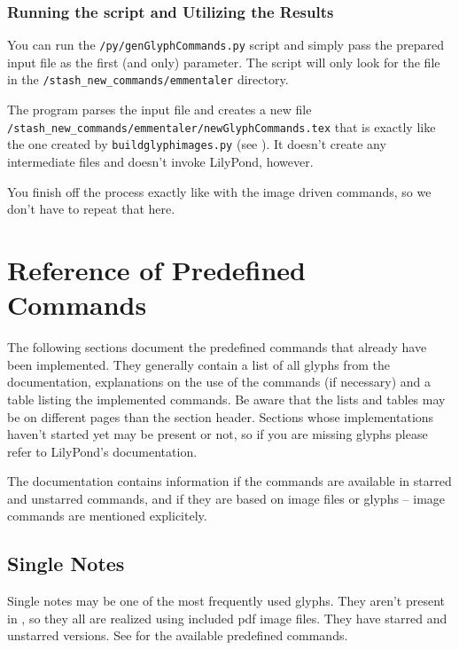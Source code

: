 \documentclass{OLLbook}
\begin{document}
\subsection{Running the script and Utilizing the Results}
\label{subsec:GGC_running_utilizing}

You can run the \texttt{/py/genGlyphCommands.py} script and simply pass the prepared input file as the first (and only) parameter.
The script will only look for the file in the \texttt{/stash\_new\_commands/emmentaler} directory.

The program parses the input file and creates a new file \texttt{/stash\_new\_commands/emmentaler/newGlyphCommands.tex} that is exactly like the one created by \texttt{buildglyphimages.py} (see ).
It doesn't create any intermediate files and doesn't invoke LilyPond, however.

You finish off the process exactly like with the image driven commands, so we don't have to repeat that here.

\pagebreak
\chapter{Reference of Predefined Commands}
\label{chap:list_predefined_commands}
The following sections document the predefined commands that already have been implemented.
They generally contain a list of all glyphs from the \emmentaler documentation, explanations on the use of the commands (if necessary) and a table listing the implemented commands.
Be aware that the lists and tables may be on different pages than the section header.
Sections whose implementations haven't started yet may be present or not, so if you are missing glyphs please refer to LilyPond's documentation.

The documentation contains information if the commands are available in starred and unstarred commands, and if they are based on image files or \emmentaler glyphs -- image commands are mentioned explicitely.

\section{Single Notes}
\label{sec:singlenotes}
Single notes may be one of the most frequently used glyphs.
They aren't present in \emmentaler*, so they all are realized using included pdf image files.
They have starred and unstarred versions.
See  for the available predefined commands.
\end{document}
